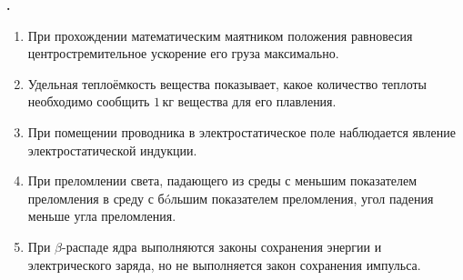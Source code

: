 \documentclass[12pt,a4paper]{article}
\newif\ifShowSolutions
\newcounter{banktask}
\newcommand{\BankTask}[3]{%
  \refstepcounter{banktask}%
  \Needspace{35mm}\par\medskip\noindent\begin{minipage}{\linewidth}%
  \noindent\textbf{\thebanktask.}\quad #2\par
  \ifShowSolutions
    #3\par
    \ifdefined\TutorEdition
      \ifcsname TutorSource#1\endcsname
        \smallskip{\small\csname TutorSource#1\endcsname\par}%
      \fi
    \fi
  \fi
  \end{minipage}\par\medskip
}
\begin{document}
\BankTask{777063}{
\begin{enumerate}
\item При прохождении математическим маятником положения равновесия центростремительное ускорение его груза максимально.
\item Удельная теплоёмкость вещества показывает, какое количество теплоты необходимо сообщить \(1\,\text{кг}\) вещества для его плавления.
\item При помещении проводника в электростатическое поле наблюдается явление электростатической индукции.
\item При преломлении света, падающего из среды с меньшим показателем преломления в среду с бóльшим показателем преломления, угол падения меньше угла преломления.
\item При \(\beta\)-распаде ядра выполняются законы сохранения энергии и электрического заряда, но не выполняется закон сохранения импульса.
\end{enumerate}
}{
\smallskip\noindent\textbf{Решение от GPT}\par
1) Верно: в положении равновесия скорость максимальна, поэтому максимально и \(a_{\text{ц}}=v^2/\ell\). 2) Неверно: удельная теплоёмкость определяется соотношением \(c=Q/(m\Delta T)\), а для плавления используют удельную теплоту плавления \(\lambda=Q/m\). 3) Верно: внешнее электростатическое поле вызывает перераспределение свободных зарядов проводника. 4) Неверно: по закону \(n_1\sin\alpha=n_2\sin\beta\) при \(n_2>n_1\) получаем \(\beta<\alpha\) для ненулевого угла падения. 5) Неверно: при \(\beta\)-распаде сохраняется также полный импульс всех участников процесса, включая нейтрино или антинейтрино; ответ: \(1,\ 3\).
}
\end{document}
